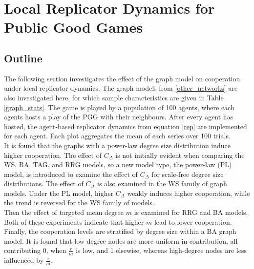 \section{Local Replicator Dynamics for Public Good Games}
\subsection{Outline}
The following section investigates the effect of the graph model on cooperation under local replicator dynamics. The graph models from \ref{other_networks} are also investigated here, for which sample characteristics are given in Table \ref{graph_stats}. The game is played by a population of 100 agents, where each agents hosts a play of the PGG with their neighbours. After every agent has hosted, the agent-based replicator dynamics from equation \eqref{rep} are implemented for each agent. Each plot aggregates the mean of each series over 100 trials. \\

It is found that the graphs with a power-law degree size distribution induce higher cooperation. The effect of $C_\Delta$ is not initially evident when comparing the WS, BA, TAG, and RRG models, so a new model type, the power-law (PL) model, is introduced to examine the effect of $C_\Delta$ for scale-free degree size distributions. The effect of $C_\Delta$ is also examined in the WS family of graph models. Under the PL model, higher $C_\Delta$ weakly induces higher cooperation, while the trend is reversed for the WS family of models. \\

Then the effect of targeted mean degree $m$ is examined for RRG and BA models. Both of these experiments indicate that higher $m$ lead to lower cooperation. Finally, the cooperation levels are stratified by degree size within a BA graph model. It is found that low-degree nodes are more uniform in contribution, all contributing 0, when $\frac{r}{m}$ is low, and 1 elsewise, whereas high-degree nodes are less influenced by $\frac{r}{m}$. \\

